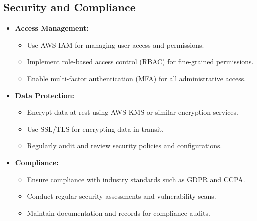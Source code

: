 \subsection{Security and Compliance}
\begin{itemize}[leftmargin=*]
    \item \textbf{Access Management:}
    \begin{itemize}
        \item Use AWS IAM for managing user access and permissions.
        \item Implement role-based access control (RBAC) for fine-grained permissions.
        \item Enable multi-factor authentication (MFA) for all administrative access.
    \end{itemize}
    
    \item \textbf{Data Protection:}
    \begin{itemize}
        \item Encrypt data at rest using AWS KMS or similar encryption services.
        \item Use SSL/TLS for encrypting data in transit.
        \item Regularly audit and review security policies and configurations.
    \end{itemize}
    
    \item \textbf{Compliance:}
    \begin{itemize}
        \item Ensure compliance with industry standards such as GDPR and CCPA.
        \item Conduct regular security assessments and vulnerability scans.
        \item Maintain documentation and records for compliance audits.
    \end{itemize}
\end{itemize}